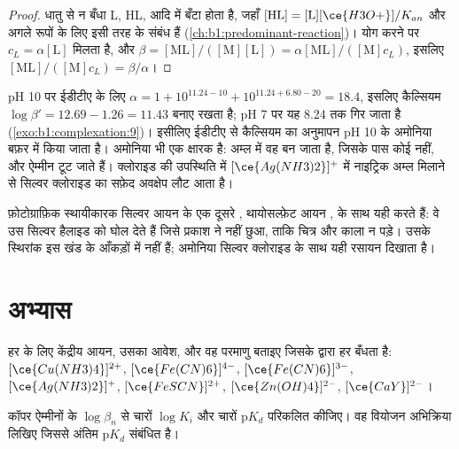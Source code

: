 \begin{proof}
धातु से न बँधा  L, HL,  आदि में
बँटा होता है, जहाँ $[\mathrm{HL}] = [\mathrm{L}][\ce{H3O+}]/K_{an}$ और
अगले रूपों के लिए इसी तरह के संबंध हैं (\cref{ch:b1:predominant-reaction})। योग करने पर $c_L = \alpha[\mathrm{L}]$ मिलता है,
और $\beta = [\mathrm{ML}]/([\mathrm{M}][\mathrm{L}]) =
\alpha[\mathrm{ML}]/([\mathrm{M}]c_L)$, इसलिए $[\mathrm{ML}]/([\mathrm{M}]c_L)
= \beta/\alpha$।
\end{proof}

pH 10 पर ईडीटीए के लिए $\alpha = 1 + 10^{11.24 - 10} + 10^{11.24 + 6.80 - 20}
= 18.4$, इसलिए कैल्सियम  $\log\beta' = 12.69 - 1.26 = 11.43$ बनाए रखता है;
pH 7 पर यह 8.24 तक गिर जाता है (\cref{exo:b1:complexation:9})। इसीलिए
ईडीटीए से कैल्सियम का अनुमापन pH 10 के अमोनिया बफ़र में किया जाता है।
अमोनिया भी एक क्षारक है: अम्ल में वह  बन जाता है, जिसके पास कोई  नहीं, और ऐम्मीन  टूट जाते हैं। क्लोराइड की उपस्थिति में
$[\ce{Ag(NH3)2}]^{+}$ में नाइट्रिक अम्ल मिलाने से सिल्वर क्लोराइड का सफ़ेद
अवक्षेप लौट आता है।

फ़ोटोग्राफ़िक स्थायीकारक सिल्वर आयन के एक दूसरे , थायोसल्फ़ेट आयन
, के साथ यही करते हैं: वे उस सिल्वर हैलाइड को घोल देते हैं जिसे
प्रकाश ने नहीं छुआ, ताकि चित्र और काला न पड़े। उसके
स्थिरांक इस खंड के आँकड़ों में नहीं हैं; अमोनिया सिल्वर क्लोराइड के साथ यही
रसायन दिखाता है।

\section{अभ्यास}

\begin{exercise}[$\star$]\label{exo:b1:complexation:1}
हर  के लिए केंद्रीय आयन, उसका आवेश,  और वह
परमाणु बताइए जिसके द्वारा हर  बँधता है: $[\ce{Cu(NH3)4}]^{2+}$,
$[\ce{Fe(CN)6}]^{4-}$, $[\ce{Fe(CN)6}]^{3-}$, $[\ce{Ag(NH3)2}]^{+}$,
$[\ce{FeSCN}]^{2+}$, $[\ce{Zn(OH)4}]^{2-}$, $[\ce{CaY}]^{2-}$।
\end{exercise}

\begin{exercise}[$\star$]\label{exo:b1:complexation:2}
कॉपर ऐम्मीनों के $\log\beta_n$ से चारों $\log K_i$
और चारों $\mathrm{p}K_d$ परिकलित कीजिए। वह वियोजन अभिक्रिया लिखिए जिससे
अंतिम $\mathrm{p}K_d$ संबंधित है।
\end{exercise}


